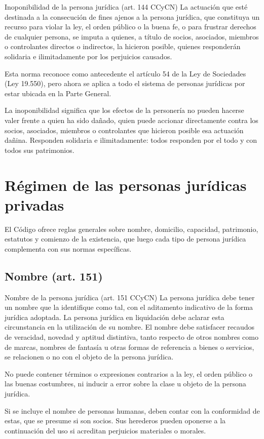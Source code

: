 \documentclass[12pt,oneside]{book}
\begin{document}
\begin{definition}{Inoponibilidad de la persona jurídica (art. 144 CCyCN)}
La actuación que esté destinada a la consecución de fines ajenos a la persona jurídica, que constituya un recurso para violar la ley, el orden público o la buena fe, o para frustrar derechos de cualquier persona, se imputa a quienes, a título de socios, asociados, miembros o controlantes directos o indirectos, la hicieron posible, quienes responderán solidaria e ilimitadamente por los perjuicios causados.
\end{definition}

Esta norma reconoce como antecedente el artículo 54 de la Ley de Sociedades (Ley 19.550), pero ahora se aplica a todo el sistema de personas jurídicas por estar ubicada en la Parte General.

La inoponibilidad significa que los efectos de la personería no pueden hacerse valer frente a quien ha sido dañado, quien puede accionar directamente contra los socios, asociados, miembros o controlantes que hicieron posible esa actuación dañina. Responden solidaria e ilimitadamente: todos responden por el todo y con todos sus patrimonios.

\chapter{Régimen de las personas jurídicas privadas}

El Código ofrece reglas generales sobre nombre, domicilio, capacidad, patrimonio, estatutos y comienzo de la existencia, que luego cada tipo de persona jurídica complementa con sus normas específicas.

\section{Nombre (art. 151)}

\begin{definition}{Nombre de la persona jurídica (art. 151 CCyCN)}
La persona jurídica debe tener un nombre que la identifique como tal, con el aditamento indicativo de la forma jurídica adoptada. La persona jurídica en liquidación debe aclarar esta circunstancia en la utilización de su nombre. El nombre debe satisfacer recaudos de veracidad, novedad y aptitud distintiva, tanto respecto de otros nombres como de marcas, nombres de fantasía u otras formas de referencia a bienes o servicios, se relacionen o no con el objeto de la persona jurídica.

No puede contener términos o expresiones contrarios a la ley, el orden público o las buenas costumbres, ni inducir a error sobre la clase u objeto de la persona jurídica.

Si se incluye el nombre de personas humanas, deben contar con la conformidad de estas, que se presume si son socios. Sus herederos pueden oponerse a la continuación del uso si acreditan perjuicios materiales o morales.
\end{definition}
\end{document}
